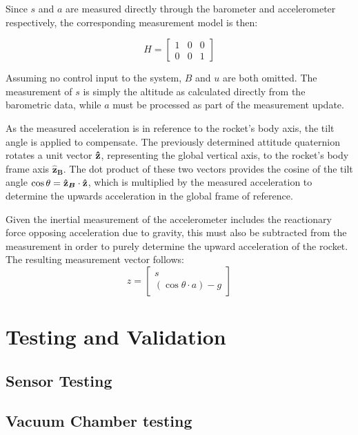Since $s$ and $a$ are measured directly through the barometer and accelerometer respectively, the corresponding measurement model is then:

\begin{equation}
  H = \begin{bmatrix}
        1 & 0 & 0\\
        0 & 0 & 1
      \end{bmatrix}
  \label{eq:kalmanH}
\end{equation}


Assuming no control input to the system, $B$ and $u$ are both omitted. The measurement of $s$ is simply the altitude as calculated directly from the barometric data, while $a$ must be processed as part of the measurement update.

As the measured acceleration is in reference to the rocket's body axis, the tilt angle is applied to compensate. The previously determined attitude quaternion rotates a unit vector $\boldsymbol{\hat{\textbf{z}}}$, representing the global vertical axis, to the rocket's body frame axis $\bm{\hat{\textbf{z}}_B}$. The dot product of these two vectors provides the cosine of the tilt angle $\cos{\theta} = \bm{\hat{\textbf{z}}_B}\cdot \boldsymbol{\hat{\textbf{z}}}$, which is multiplied by the measured acceleration to determine the upwards acceleration in the global frame of reference. 

Given the inertial measurement of the accelerometer includes the reactionary force opposing acceleration due to gravity, this must also be subtracted from the measurement in order to purely determine the upward acceleration of the rocket. The resulting measurement vector follows:
\begin{equation}
  z = \begin{bmatrix}
        s\\
        (\cos{\theta}\cdot a)-g
      \end{bmatrix}
  \label{eq:kalmanZ}
\end{equation}


\section{Testing and Validation}
\subsection{Sensor Testing}
\subsection{Vacuum Chamber testing}

